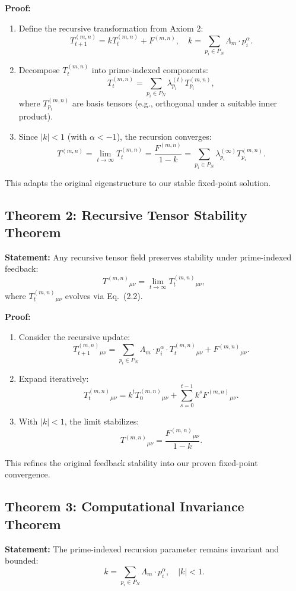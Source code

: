 \documentclass{article}
\theoremstyle{plain}
\begin{document}
\textbf{Proof:}
\begin{enumerate}
    \item Define the recursive transformation from Axiom 2:
    \[
    T_{t+1}^{(m,n)} = k T_t^{(m,n)} + F^{(m,n)}, \quad k = \sum_{p_i \in P_N} \Lambda_m \cdot p_i^\alpha.
    \]
    \item Decompose \( T_t^{(m,n)} \) into prime-indexed components:
    \[
    T_t^{(m,n)} = \sum_{p_i \in P_N} \lambda_{p_i}^{(t)} T_{p_i}^{(m,n)},
    \]
    where \( T_{p_i}^{(m,n)} \) are basis tensors (e.g., orthogonal under a suitable inner product).
    \item Since \( |k| < 1 \) (with \( \alpha < -1 \)), the recursion converges:
    \[
    T^{(m,n)} = \lim_{t \to \infty} T_t^{(m,n)} = \frac{F^{(m,n)}}{1 - k} = \sum_{p_i \in P_N} \lambda_{p_i}^{(\infty)} T_{p_i}^{(m,n)}.
    \]
\end{enumerate}
This adapts the original eigenstructure to our stable fixed-point solution.

\subsection{Theorem 2: Recursive Tensor Stability Theorem}
\textbf{Statement:} Any recursive tensor field preserves stability under prime-indexed feedback:
\begin{equation}
    T^{(m,n)}{}_{\mu\nu} = \lim_{t \to \infty} T_t^{(m,n)}{}_{\mu\nu},
\end{equation}
where \( T_t^{(m,n)}{}_{\mu\nu} \) evolves via Eq.~(2.2).

\textbf{Proof:}
\begin{enumerate}
    \item Consider the recursive update:
    \[
    T_{t+1}^{(m,n)}{}_{\mu\nu} = \sum_{p_i \in P_N} \Lambda_m \cdot p_i^\alpha \cdot T_t^{(m,n)}{}_{\mu\nu} + F^{(m,n)}{}_{\mu\nu}.
    \]
    \item Expand iteratively:
    \[
    T_t^{(m,n)}{}_{\mu\nu} = k^t T_0^{(m,n)}{}_{\mu\nu} + \sum_{s=0}^{t-1} k^s F^{(m,n)}{}_{\mu\nu}.
    \]
    \item With \( |k| < 1 \), the limit stabilizes:
    \[
    T^{(m,n)}{}_{\mu\nu} = \frac{F^{(m,n)}{}_{\mu\nu}}{1 - k}.
    \]
\end{enumerate}
This refines the original feedback stability into our proven fixed-point convergence.

\subsection{Theorem 3: Computational Invariance Theorem}
\textbf{Statement:} The prime-indexed recursion parameter remains invariant and bounded:
\begin{equation}
    k = \sum_{p_i \in P_N} \Lambda_m \cdot p_i^\alpha, \quad |k| < 1.
\end{equation}
\end{document}

